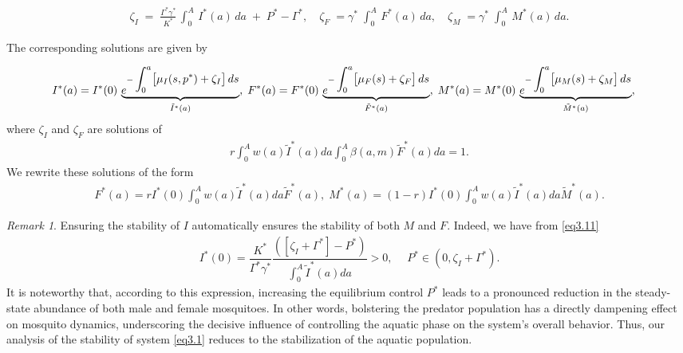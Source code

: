 \documentclass[10pt, a4paper]{amsart}
\theoremstyle{plain}
\theoremstyle{definition}
\theoremstyle{remark}
\newtheorem{remark}[lemma]{Remark}
\numberwithin{equation}{section}
\begin{document}
\begin{align}\label{e3.47}
    \zeta_I 
\;=\; \frac{\Gamma^*\gamma^*}{K^*}\,\displaystyle \int_{0}^{A} \,I^*(a)\,da \;+\; P^*-\Gamma^*,
\quad
\zeta_F 
\;=\gamma^*\;\displaystyle \int_{0}^{A} \,F^*(a)\,da,
\quad
\zeta_M 
\;=\gamma^*\; \displaystyle \int_{0}^{A} \,M^*(a)\,da.
\end{align}

The corresponding solutions are given by

\begin{align}\label{e3.48}
    I^*(a)= I^*(0)\,\underbrace{e^{-\displaystyle\int_{0}^{a}\bigl[\mu_I(s,p^*) + \zeta_I\bigr]\,ds}}_{\Tilde{I}^*(a)},\;F^*(a) 
= F^*(0)\,\underbrace{e^{-\displaystyle\int_{0}^{a}\bigl[\mu_F(s) + \zeta_F\bigr]\,ds}}_{\Tilde{F}^*(a)},\;M^*(a) 
&= M^*(0)\,\underbrace{e^{-\displaystyle\int_{0}^{a}\bigl[\mu_M(s) + \zeta_M\bigr]\,ds}}_{\Tilde{M}^*(a)},
\end{align}
where $\zeta_I$ and $\zeta_F$ are solutions of 
\begin{align}\label{e3.49}
r\displaystyle\int_0^Aw(a)\tilde{I}^*(a)da\displaystyle\int_{0}^A\beta(a,m)\tilde{F}^*(a)da=1.
\end{align}
We rewrite these solutions of the form
\begin{align}\label{e3.50}
    F^*(a)=rI^*(0)\displaystyle\int_0^Aw(a)\tilde{I}^*(a)da\tilde{F}^*(a),\;M^*(a)=(1-r)I^*(0)\displaystyle\int_0^Aw(a)\tilde{I}^*(a)da\tilde{M}^*(a).
\end{align}
\begin{remark}
 Ensuring the stability of $I$ automatically ensures the stability of both $M$ and $F$. Indeed, we have from \eqref{eq3.11} 
\begin{align}\label{e3.51}
  I^*(0)=\dfrac{K^*}{\Gamma^*\gamma^*}\dfrac{(\left[\zeta_I+\Gamma^*\right]-P^*)}{\displaystyle\int_0^A\tilde{I}^*(a)da}>0,\quad\; P^*\in (0,\zeta_I+\Gamma^*).
\end{align}
It is noteworthy that, according to this expression, increasing the equilibrium control $P^*$ leads to a pronounced reduction in the steady-state abundance of both male and female mosquitoes. In other words, bolstering the predator population has a directly dampening effect on mosquito dynamics, underscoring the decisive influence of controlling the aquatic phase on the system’s overall behavior. Thus, our analysis of the stability of system \eqref{eq3.1} reduces to the stabilization of the aquatic population.
\end{remark}
\end{document}
